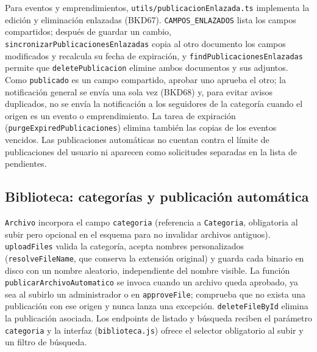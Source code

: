 Para eventos y emprendimientos, \texttt{utils/publicacionEnlazada.ts} implementa la edición y eliminación enlazadas (BKD67). \texttt{CAMPOS\_ENLAZADOS} lista los campos compartidos; después de guardar un cambio, \texttt{sincronizarPublicacionesEnlazadas} copia al otro documento los campos modificados y recalcula su fecha de expiración, y \texttt{findPublicacionesEnlazadas} permite que \texttt{deletePublicacion} elimine ambos documentos y sus adjuntos. Como \texttt{publicado} es un campo compartido, aprobar uno aprueba el otro; la notificación general se envía una sola vez (BKD68) y, para evitar avisos duplicados, no se envía la notificación a los seguidores de la categoría cuando el origen es un evento o emprendimiento. La tarea de expiración (\texttt{purgeExpiredPublicaciones}) elimina también las copias de los eventos vencidos. Las publicaciones automáticas no cuentan contra el límite de publicaciones del usuario ni aparecen como solicitudes separadas en la lista de pendientes.

\subsection{Biblioteca: categorías y publicación automática}
\texttt{Archivo} incorpora el campo \texttt{categoria} (referencia a \texttt{Categoria}, obligatoria al subir pero opcional en el esquema para no invalidar archivos antiguos). \texttt{uploadFiles} valida la categoría, acepta nombres personalizados (\texttt{resolveFileName}, que conserva la extensión original) y guarda cada binario en disco con un nombre aleatorio, independiente del nombre visible. La función \texttt{publicarArchivoAutomatico} se invoca cuando un archivo queda aprobado, ya sea al subirlo un administrador o en \texttt{approveFile}; comprueba que no exista una publicación con ese origen y nunca lanza una excepción. \texttt{deleteFileById} elimina la publicación asociada. Los endpoints de listado y búsqueda reciben el parámetro \texttt{categoria} y la interfaz (\texttt{biblioteca.js}) ofrece el selector obligatorio al subir y un filtro de búsqueda.

